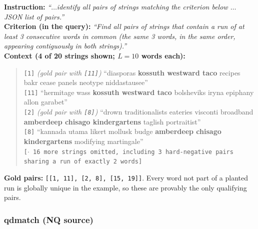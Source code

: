\textbf{Instruction:} \emph{``$\dots$identify all pairs of strings matching the criterion below
$\dots$ JSON list of pairs.''}\\
\textbf{Criterion (in the query):} \emph{``Find all pairs of strings that contain a run of at least 3
consecutive words in common (the same 3 words, in the same order, appearing contiguously in both
strings).''}\\
\textbf{Context (4 of 20 strings shown; $L{=}10$ words each):}
\begin{quote}\small
\texttt{[1]} \emph{(gold pair with \texttt{[11]})} ``diasporas \textbf{kossuth westward taco}
recipes bakr cease panels neotype niddastausee''\\
\texttt{[11]} ``hermitage wass \textbf{kossuth westward taco} bolsheviks iryna epiphany allon
garabet''\\
\texttt{[2]} \emph{(gold pair with \texttt{[8]})} ``drown traditionalists eateries visconti broadband
\textbf{amberdeep chisago kindergartens} taglish portraitist''\\
\texttt{[8]} ``kannada utama likert mollusk budge \textbf{amberdeep chisago kindergartens} modifying
martingale''\\
\texttt{[$\cdot$ 16 more strings omitted, including 3 hard-negative pairs sharing a run of exactly 2
words]}
\end{quote}
\textbf{Gold pairs:} \texttt{[[1, 11], [2, 8], [15, 19]]}. Every word not part of a planted run is
globally unique in the example, so these are provably the only qualifying pairs.

\subsubsection{qdmatch (NQ source)}


